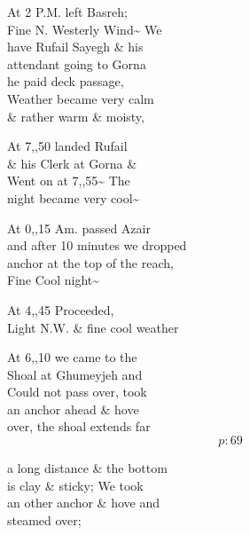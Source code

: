 \documentclass{report}
\begin{document}
	\par{
 	At 2 P.M. left Basreh;\ \\Fine N. Westerly Wind\~{} We\ \\have Rufail Sayegh \& his\ \\attendant going to Gorna\ \\he paid deck passage,\ \\Weather became very calm\ \\\& rather warm \& moisty,\ \\
	}

	\par{
 	At 7,,50 landed Rufail\ \\\& his Clerk at Gorna \&\ \\Went on at 7,,55\~{} The\ \\night became very cool\~{}\ \\
	}

	\par{
 	At 0,,15 Am. passed Azair\ \\and after 10 minutes we dropped\ \\anchor at the top of the reach,\ \\Fine Cool night\~{}\ \\
	}

	\par{
 	At 4,,45 Proceeded,\ \\Light N.W. \& fine cool weather\ \\
	}

	\par{
 	At 6,,10 we came to the\ \\Shoal at Ghumeyjeh and\ \\Could not pass over, took\ \\an anchor ahead \& hove\ \\over, the shoal extends far\ \\
  \[p: 69 \]

	}




	\par{
 	a long distance \& the bottom\ \\is clay \& sticky; We took\ \\an other anchor \& hove and\ \\steamed over;\ \\
	}
\end{document}
